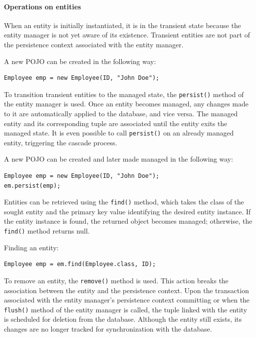 \paragraph*{Operations on entities}
When an entity is initially instantiated, it is in the transient state because the entity manager is not yet aware of its existence. 
Transient entities are not part of the persistence context associated with the entity manager.
\begin{example}
    A new POJO can be created in the following way: 
    \begin{lstlisting}[style=Java]
Employee emp = new Employee(ID, "John Doe"); 
    \end{lstlisting}
\end{example}
To transition transient entities to the managed state, the \texttt{persist()} method of the entity manager is used.
Once an entity becomes managed, any changes made to it are automatically applied to the database, and vice versa.
The managed entity and its corresponding tuple are associated until the entity exits the managed state.
It is even possible to call \texttt{persist()} on an already managed entity, triggering the cascade process.
\begin{example}
    A new POJO can be created and later made managed in the following way: 
    \begin{lstlisting}[style=Java]
Employee emp = new Employee(ID, "John Doe"); 
em.persist(emp);
    \end{lstlisting}
\end{example}
Entities can be retrieved using the \texttt{find()} method, which takes the class of the sought entity and the primary key value identifying the desired entity instance.
If the entity instance is found, the returned object becomes managed; otherwise, the \texttt{find()} method returns null.
\begin{example}
    Finding an entity: 
    \begin{lstlisting}[style=Java]
Employee emp = em.find(Employee.class, ID);
    \end{lstlisting}
\end{example}
To remove an entity, the \texttt{remove()} method is used. 
This action breaks the association between the entity and the persistence context.
Upon the transaction associated with the entity manager's persistence context committing or when the \texttt{flush()} method of the entity manager is called, the tuple linked with the entity is scheduled for deletion from the database.
Although the entity still exists, its changes are no longer tracked for synchronization with the database.
